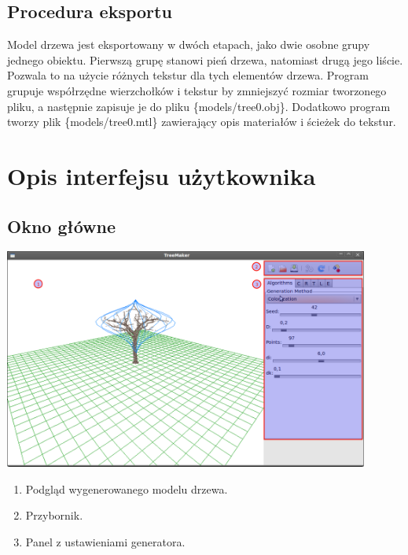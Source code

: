 \subsection{Procedura eksportu}
Model drzewa jest eksportowany w dwóch etapach, jako dwie osobne grupy jednego obiektu. Pierwszą grupę stanowi pień drzewa, natomiast drugą jego liście.
Pozwala to na użycie różnych tekstur dla tych elementów drzewa. Program grupuje współrzędne wierzchołków i tekstur by zmniejszyć rozmiar tworzonego pliku, a następnie
zapisuje je do pliku \{models/tree0.obj\}. Dodatkowo program tworzy plik \{models/tree0.mtl\} zawierający opis materiałów i ścieżek do tekstur. 
\section{Opis interfejsu użytkownika}

\subsection{Okno główne}
\includegraphics[width=120mm]{images/gui/main_window.png}
\begin{enumerate}
	\item {Podgląd wygenerowanego modelu drzewa.}
	\item {Przybornik.}
	\item {Panel z ustawieniami generatora.}
\end{enumerate}

